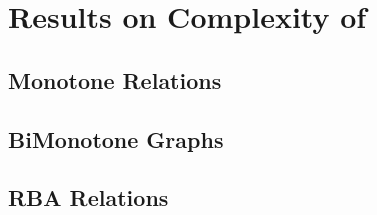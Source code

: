 \chapter{Results on Complexity of \cbis}
\section{Monotone Relations}
\section{BiMonotone Graphs}
\section{RBA Relations}
